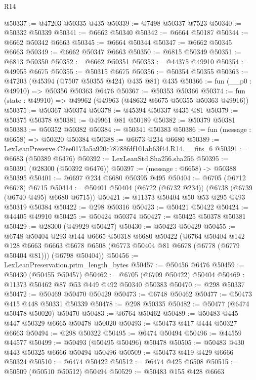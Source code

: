 \begin{lexlean}{R14}
\begin{coremodule}
@50337 := @47203 @50335 @435
@50339 := @7498 @50337 @7523
@50340 := @50332 @50339
@50341 := @6662 @50340
@50342 := @6664 @50187
@50344 := @6662 @50342 @6663
@50345 := @6664 @50344
@50347 := @6662 @50345 @6663
@50349 := @6662 @50347 @6663
@50350 := @6815 @50349
@50351 := @6813 @50350
@50352 := @6662 @50351
@50353 := @44375 @49910
@50354 := @49955 @6675
@50355 := @50315 @6675
@50356 := @50354 @50355
@50363 := @47203 (@45394 (@7507 @50355 @424) @435 @81) @435
@50366 := fun (__p0 : @49910) => @50356 @50363 @6476
@50367 := @50353 @50366
@50374 := fun (state : @49910) => @49962 (@49963 (@48632 @6675 @50355 @50363 @49916))
@50375 := @50367 @50374
@50378 := @45394 @50337 @435 @81
@50379 := @50375 @50378
@50381 := @49961 @81 @50189
@50382 := @50379 @50381
@50383 := @50352 @50382
@50384 := @50341 @50383
@50386 := fun (message : @6658) => @50320 @50384
@50388 := @6673 @234 @6680
@50389 := LexLeanPreserve.C2ee0173a5a920c78788fdf101ab63f44.R14.__fits_6
@50391 := @6683 (@50389 @6476)
@50392 := LexLeanStd.Sha256.sha256
@50395 := @50391 (@28300 (@50392 @6476))
@50397 := (message : @6658) -> @50388 @50395
@50401 := @6697 @234 @6680 @50395 @495
@50404 := @6705 (@6712 @6678) @6715
@50414 := @50401 @50404 (@6722 (@6732 @234)) (@6738 (@6739 (@6740 @495) @6680 @6715))
@50421 := @11373 @50404 @50 @53 @295 @493 @50319 @50384
@50422 := @298 @50316
@50423 := @50421 @50422
@50424 := @44405 @49910
@50425 := @50424 @50374
@50427 := @50425 @50378 @50381
@50429 := @28300 (@49929 @50427)
@50430 := @50423 @50429
@50455 := @6748
    @50404
    @293
    @144
    @6665
    @50318
    @6680
    @50422
    (@6764
      @50404
      @142
      @128
      @6663
      @6663
      @6678
      @6508
      (@6773 @50404 @81 @6678 (@6778 (@6779 @50404 @81)))
      (@6798 @50404))
@50456 := LexLeanPreservation.prim_length_bytes
@50457 := @50456 @6476
@50459 := @50430 (@50455 @50457)
@50462 := @6705 (@6709 @50422) @50404
@50469 := @11373 @50462 @87 @53 @449 @492 @50340 @50383
@50470 := @298 @50337
@50472 := @50469 @50470 @50429
@50473 := @6748 @50462
@50477 := @50473 @415 @448 @50331 @50339
@50478 := @298 @50335
@50482 := @50477 (@6474 @50478 @50020) @50470
@50483 := @6764 @50462
@50489 := @50483 @445 @447 @50329 @6665 @50478 @50020
@50493 := @50473 @417 @444 @50327 @6663
@50494 := @298 @50322
@50495 := @6474 @50494
@50496 := @44559 @44577
@50499 := @50493 (@50495 @50496) @50478
@50505 := @50483 @430 @443 @50325 @6666 @50494 @50496
@50509 := @50473 @419 @429 @6666 @50324
@50510 := @6474 @50422
@50512 := @6474 @425 @6508
@50515 := @50509 (@50510 @50512) @50494
@50529 := @50483
    @155
    @428
    @6663

\end{coremodule}
\end{lexlean}
